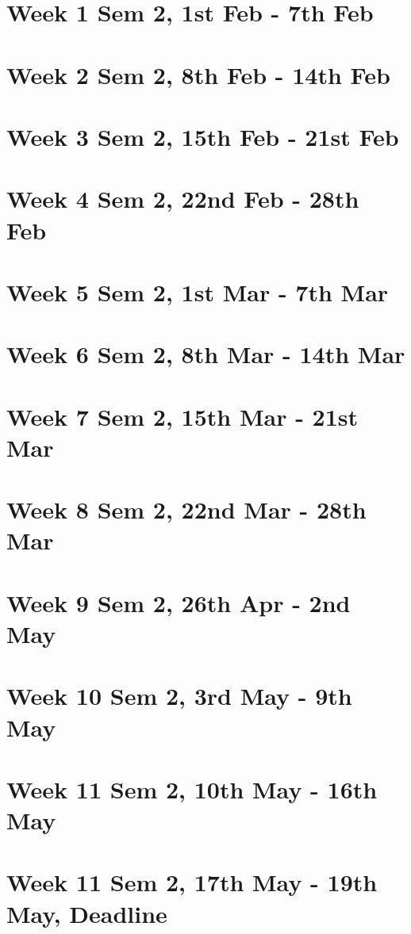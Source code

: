 \documentclass[11pt]{article}
\begin{document}
\section*{Week 1 Sem 2, 1st Feb - 7th Feb}


\section*{Week 2 Sem 2, 8th Feb - 14th Feb}


\section*{Week 3 Sem 2, 15th Feb - 21st Feb}


\section*{Week 4 Sem 2, 22nd Feb - 28th Feb}


\section*{Week 5 Sem 2, 1st Mar - 7th Mar}


\section*{Week 6 Sem 2, 8th Mar - 14th Mar}


\section*{Week 7 Sem 2, 15th Mar - 21st Mar}


\section*{Week 8 Sem 2, 22nd Mar - 28th Mar}


\section*{Week 9 Sem 2, 26th Apr - 2nd May}


\section*{Week 10 Sem 2, 3rd May - 9th May}


\section*{Week 11 Sem 2, 10th May - 16th May}


\section*{Week 11 Sem 2, 17th May - 19th May, Deadline}
\end{document}
